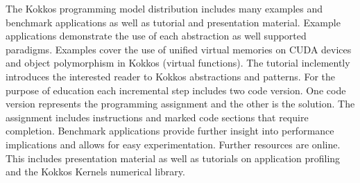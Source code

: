 
The Kokkos programming model distribution includes many examples and benchmark applications as well as tutorial and presentation material. Example applications demonstrate the use of each abstraction as well supported paradigms. Examples cover the use of unified virtual memories on CUDA devices and object polymorphism in Kokkos (virtual functions). The tutorial inclemently introduces the interested reader to Kokkos abstractions and patterns. For the purpose of education each incremental step includes two code version. One code version represents the programming assignment and the other is the solution. The assignment includes instructions and marked code sections that require completion. Benchmark applications provide further insight into performance implications and allows for easy experimentation. Further resources are online. This includes presentation material as well as tutorials on application profiling and the Kokkos Kernels numerical library.